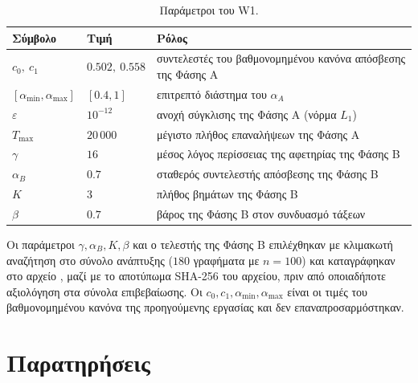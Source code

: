 \documentclass[11pt,a4paper]{article}
\newcommand{\Czero}{0.502}
\newcommand{\Cone}{0.558}
\newcommand{\Amin}{0.4}
\newcommand{\Amax}{1}
\newcommand{\Tol}{10^{-12}}
\newcommand{\Tmax}{20\,000}
\newcommand{\Gam}{16}
\newcommand{\AB}{0.7}
\newcommand{\KB}{3}
\newcommand{\Beta}{0.7}
\begin{document}
\begin{table}[H]
\centering
\caption{Παράμετροι του W1.}\label{tab:params}
\small
\begin{tabular}{@{}l l l@{}}
\toprule
Σύμβολο & Τιμή & Ρόλος \\
\midrule
$c_0,\ c_1$ & $\Czero,\ \Cone$ & συντελεστές του βαθμονομημένου κανόνα απόσβεσης της Φάσης Α \\
$[\alpha_{\min},\alpha_{\max}]$ & $[\Amin,\Amax]$ & επιτρεπτό διάστημα του $\alpha_A$ \\
$\varepsilon$ & $\Tol$ & ανοχή σύγκλισης της Φάσης Α (νόρμα $L_1$) \\
$T_{\max}$ & $\Tmax$ & μέγιστο πλήθος επαναλήψεων της Φάσης Α \\
$\gamma$ & $\Gam$ & μέσος λόγος περίσσειας της αφετηρίας της Φάσης Β \\
$\alpha_B$ & $\AB$ & σταθερός συντελεστής απόσβεσης της Φάσης Β \\
$K$ & $\KB$ & πλήθος βημάτων της Φάσης Β \\
$\beta$ & $\Beta$ & βάρος της Φάσης Β στον συνδυασμό τάξεων \\
\bottomrule
\end{tabular}
\end{table}

Οι παράμετροι $\gamma,\alpha_B,K,\beta$ και ο τελεστής της Φάσης Β επιλέχθηκαν με κλιμακωτή αναζήτηση στο σύνολο ανάπτυξης ($180$ γραφήματα με $n=100$) και καταγράφηκαν στο αρχείο , μαζί με το αποτύπωμα SHA-256 του αρχείου, πριν από οποιαδήποτε αξιολόγηση στα σύνολα επιβεβαίωσης. Οι $c_0,c_1,\alpha_{\min},\alpha_{\max}$ είναι οι τιμές του βαθμονομημένου κανόνα της προηγούμενης εργασίας και δεν επαναπροσαρμόστηκαν.

\section{Παρατηρήσεις}
\end{document}
